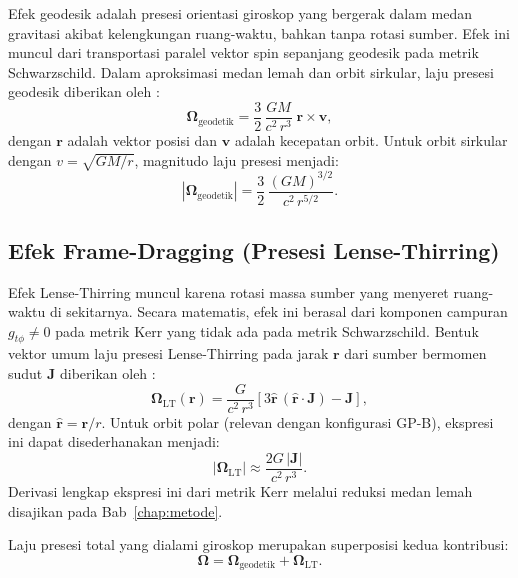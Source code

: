 Efek geodesik adalah presesi orientasi giroskop yang bergerak dalam medan gravitasi akibat kelengkungan ruang-waktu, bahkan tanpa rotasi sumber. Efek ini muncul dari transportasi paralel vektor spin sepanjang geodesik pada metrik Schwarzschild. Dalam aproksimasi medan lemah dan orbit sirkular, laju presesi geodesik diberikan oleh \parencite{Will2014Confrontation}:
\begin{equation}
    \bm{\Omega}_{\text{geodetik}} = \frac{3}{2}\,\frac{GM}{c^2\,r^3}\; \mathbf{r} \times \mathbf{v},
    \label{eq:omega-geodetic}
\end{equation}
dengan $\mathbf{r}$ adalah vektor posisi dan $\mathbf{v}$ adalah kecepatan orbit. Untuk orbit sirkular dengan $v = \sqrt{GM/r}$, magnitudo laju presesi menjadi:
\begin{equation}
    |\bm{\Omega}_{\text{geodetik}}| = \frac{3}{2}\,\frac{(GM)^{3/2}}{c^2\, r^{5/2}}.
    \label{eq:omega-geodetic-circular}
\end{equation}


\subsection{Efek Frame-Dragging (Presesi Lense-Thirring)}
\label{subsec:frame-dragging}

Efek Lense-Thirring muncul karena rotasi massa sumber yang menyeret ruang-waktu di sekitarnya. Secara matematis, efek ini berasal dari komponen campuran $g_{t\phi} \neq 0$ pada metrik Kerr yang tidak ada pada metrik Schwarzschild. Bentuk vektor umum laju presesi Lense-Thirring pada jarak $\mathbf{r}$ dari sumber bermomen sudut $\mathbf{J}$ diberikan oleh \parencite{Lense1918LenseThirring}:
\begin{equation}
    \bm{\Omega}_{\text{LT}}(\mathbf{r})
    = \frac{G}{c^2\, r^3}\left[3\hat{\mathbf{r}}\,(\hat{\mathbf{r}} \cdot \mathbf{J}) - \mathbf{J}\right],
    \label{eq:omega-lt-general}
\end{equation}
dengan $\hat{\mathbf{r}} = \mathbf{r}/r$. Untuk orbit polar (relevan dengan konfigurasi GP-B), ekspresi ini dapat disederhanakan menjadi:
\begin{equation}
    |\bm{\Omega}_{\text{LT}}| \approx \frac{2G\,|\mathbf{J}|}{c^2\, r^3}.
    \label{eq:omega-lt-approx}
\end{equation}
Derivasi lengkap ekspresi ini dari metrik Kerr melalui reduksi medan lemah disajikan pada Bab~\ref{chap:metode}.

Laju presesi total yang dialami giroskop merupakan superposisi kedua kontribusi:
\begin{equation}
    \bm{\Omega} = \bm{\Omega}_{\text{geodetik}} + \bm{\Omega}_{\text{LT}}.
    \label{eq:omega-total}
\end{equation}


